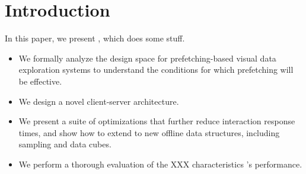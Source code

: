 
\section{Introduction}

\label{s:intro}



In this paper, we present \sys, which does some stuff.   

\begin{itemize}[leftmargin=*, topsep=0mm, itemsep=0mm]

\item We formally analyze the design space for prefetching-based visual data exploration systems to understand the conditions for which prefetching will be effective.

\item We design a novel client-server architecture.

\item We present a suite of optimizations that further reduce interaction response times, and show how to extend to new offline data structures, including sampling and data cubes.

\item We perform a thorough evaluation of the XXX characteristics \sys's performance.  

\end{itemize}
